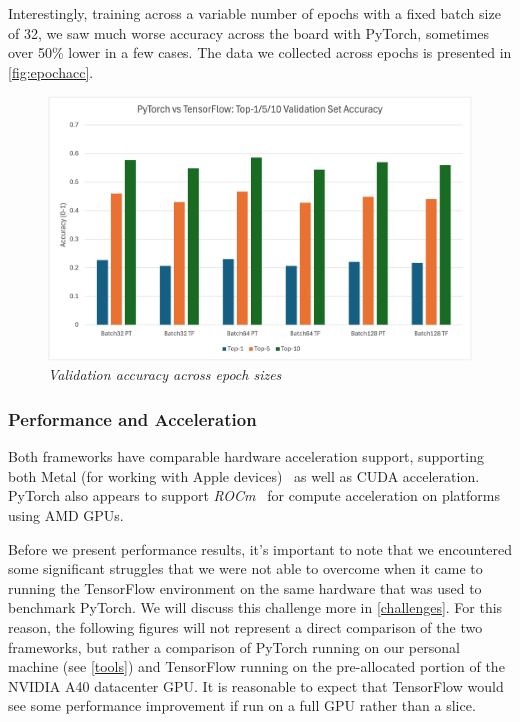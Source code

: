 \documentclass[letterpaper,twocolumn,10pt]{article}
\begin{document}
Interestingly, training across a variable number of epochs with a fixed batch size of 32, we saw much worse accuracy across the board with PyTorch, sometimes over 50\% lower in a few cases. The data we collected across epochs is presented in \autoref{fig:epochacc}.

\begin{figure}[ht]
    \centering
    \includegraphics[width=1.0\linewidth]{Figures/Batch_Comp.png}
    \caption{\textit{Validation accuracy across epoch sizes}}
    \label{fig:epochacc}
\end{figure}

\subsubsection{Performance and Acceleration}
Both frameworks have comparable hardware acceleration support, supporting both Metal (for working with Apple devices)~\cite{tfmetal, ptmetal} as well as CUDA acceleration. PyTorch also appears to support \textit{ROCm}~\cite{ptrocm} for compute acceleration on platforms using AMD GPUs.

Before we present performance results, it's important to note that we encountered some significant struggles that we were not able to overcome when it came to running the TensorFlow environment on the same hardware that was used to benchmark PyTorch. We will discuss this challenge more in \autoref{challenges}. For this reason, the following figures will not represent a direct comparison of the two frameworks, but rather a comparison of PyTorch running on our personal machine (see \autoref{tools}) and TensorFlow running on the pre-allocated portion of the NVIDIA A40 datacenter GPU. It is reasonable to expect that TensorFlow would see some performance improvement if run on a full GPU rather than a slice.
\end{document}
